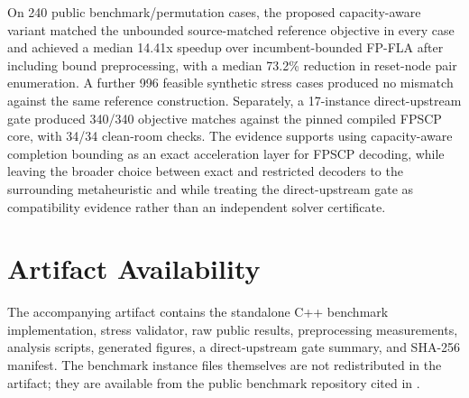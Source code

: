 \documentclass[11pt]{article}
\begin{document}
On 240 public benchmark/permutation cases, the proposed capacity-aware variant matched the unbounded source-matched reference objective in every case and achieved a median 14.41x speedup over incumbent-bounded FP-FLA after including bound preprocessing, with a median 73.2\% reduction in reset-node pair enumeration. A further 996 feasible synthetic stress cases produced no mismatch against the same reference construction. Separately, a 17-instance direct-upstream gate produced 340/340 objective matches against the pinned compiled FPSCP core, with 34/34 clean-room checks. The evidence supports using capacity-aware completion bounding as an exact acceleration layer for FPSCP decoding, while leaving the broader choice between exact and restricted decoders to the surrounding metaheuristic and while treating the direct-upstream gate as compatibility evidence rather than an independent solver certificate.

\section*{Artifact Availability}
The accompanying artifact contains the standalone C++ benchmark implementation, stress validator, raw public results, preprocessing measurements, analysis scripts, generated figures, a direct-upstream gate summary, and SHA-256 manifest. The benchmark instance files themselves are not redistributed in the artifact; they are available from the public benchmark repository cited in \cite{mavrovouniotis2020}.
\end{document}
